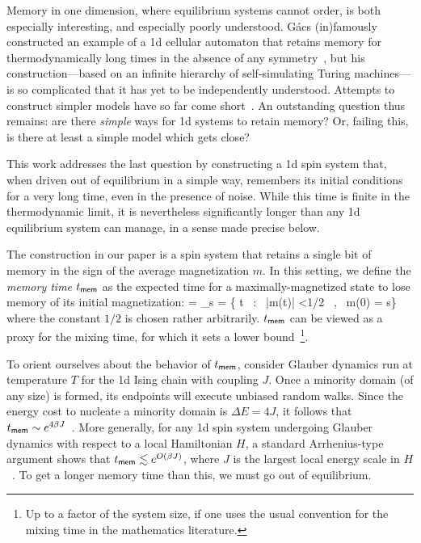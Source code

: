 \documentclass[prl,aps,twocolumn,groupedaddress,superscriptaddress,preprintnumbers,nobibnotes]{revtex4-2}
\newcommand{\oEE}{\mathop{\mathbb{E}}}
\newcommand{\tmem}{{t_{\sf mem}}}
\begin{document}
	Memory in one dimension, where equilibrium systems cannot order, is both especially interesting, and especially poorly understood. G\'acs (in)famously constructed an example of a 1d cellular automaton that retains memory for thermodynamically long times in the absence of any symmetry~\cite{gacs2001reliable}, but his construction---based on an infinite hierarchy of self-simulating Turing machines---is so complicated that it has yet to be independently understood. Attempts to construct simpler models have so far come short~\cite{gacs1978one,toom1995cellular,park1997ergodicity}. An outstanding question thus remains: are there {\it simple} ways for 1d systems to retain memory? Or, failing this, is there at least a simple model which gets close? 
	
	This work addresses the last question by constructing a 1d spin system that, when driven out of equilibrium in a simple way, remembers its initial conditions for a very long time, even in the presence of noise. While this time is finite in the thermodynamic limit, it is nevertheless significantly longer than any 1d equilibrium system can manage, in a sense made precise below. 
	
	The construction in our paper is a spin system that retains a single bit of memory in the sign of the average magnetization $m$. In this setting, we define the {\it memory time} $\tmem$ as the expected time for a maximally-magnetized state to lose memory of its initial magnetization: 
	\be \tmem = \oEE \min_{s = }  \{ t \, : \,  |m(t)| <1/2 \, , \, m(0) = s\} \ee 
	where the constant $1/2$ is chosen rather arbitrarily. $\tmem$ can be viewed as a proxy for the mixing time, for which it sets a lower bound~\footnote{Up to a factor of the system size, if one uses the usual convention for the mixing time in the mathematics literature.}.
	
	To orient ourselves about the behavior of $\tmem$, consider Glauber dynamics run at temperature $T$ for the 1d Ising chain with coupling $J$. Once a minority domain (of any size) is formed, its endpoints will execute unbiased random walks. Since the energy cost to nucleate a minority domain is $\Delta E = 4J$, it follows that $\tmem \sim e^{4\b J}$~\cite{levin2026markov}. More generally, for any 1d spin system undergoing Glauber dynamics with respect to a local Hamiltonian $H$, a standard Arrhenius-type argument shows that $\tmem \lesssim  e^{O( \b J)}$, where $J$ is the largest local energy scale in $H$~\cite{bovier2016metastability,temme2017thermalization}. To get a longer memory time than this, we must go out of equilibrium. 
	
\end{document}
